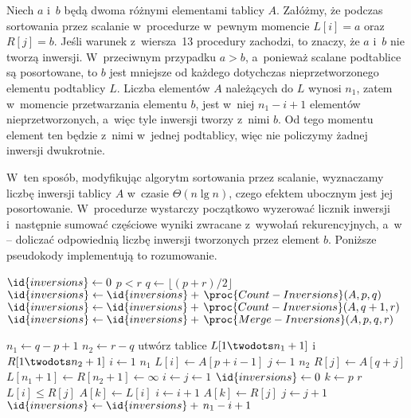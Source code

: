 \subproblem %
Niech $a$ i~$b$ będą dwoma różnymi elementami tablicy $A$. Załóżmy, że podczas sortowania przez scalanie w~procedurze  w~pewnym momencie $L[i]=a$ oraz $R[j]=b$. Jeśli warunek z~wiersza~13 procedury  zachodzi, to znaczy, że $a$ i~$b$ nie tworzą inwersji. W~przeciwnym przypadku $a>b$, a~ponieważ scalane podtablice są posortowane, to $b$ jest mniejsze od każdego dotychczas nieprzetworzonego elementu podtablicy $L$. Liczba elementów $A$ należących do $L$ wynosi $n_1$, zatem w~momencie przetwarzania elementu $b$, jest w~niej $n_1-i+1$ elementów nieprzetworzonych, a~więc tyle inwersji tworzy z~nimi $b$. Od tego momentu element ten będzie z~nimi w~jednej podtablicy, więc nie policzymy żadnej inwersji dwukrotnie.

W~ten sposób, modyfikując algorytm sortowania przez scalanie, wyznaczamy liczbę inwersji  tablicy $A$ w~czasie $\Theta(n\lg n)$, czego efektem ubocznym jest jej posortowanie. W~procedurze  wystarczy początkowo wyzerować licznik inwersji i~następnie sumować częściowe wyniki zwracane z~wywołań rekurencyjnych, a~w~ -- doliczać odpowiednią liczbę inwersji tworzonych przez element $b$. Poniższe pseudokody implementują to rozumowanie.

\begin{codebox}
\li	$\id{inversions}\gets0$
\li	\If $p<r$
\li		\Then
			$q\gets\lfloor(p+r)/2\rfloor$
\li			$\id{inversions}\gets\id{inversions}+\,\proc{Count-Inversions}(A,p,q)$
\li			$\id{inversions}\gets\id{inversions}+\,\proc{Count-Inversions}(A,q+1,r)$
\li			$\id{inversions}\gets\id{inversions}+\,\proc{Merge-Inversions}(A,p,q,r)$
		\End
\li	\Return {}
\end{codebox}

\begin{codebox}
\li	$n_1\gets q-p+1$
\li	$n_2\gets r-q$
\li	utwórz tablice $L[1\twodots n_1+1]$ i~$R[1\twodots n_2+1]$
\li	\For $i\gets1$ \To $n_1$
\li		\Do $L[i]\gets A[p+i-1]$
		\End
\li	\For $j\gets1$ \To $n_2$
\li		\Do $R[j]\gets A[q+j]$
		\End
\li	$L[n_1+1]\gets R[n_2+1]\gets\infty$
\li	$i\gets j\gets1$
\li	$\id{inversions}\gets0$
\li	\For $k\gets p$ \To $r$
\li		\Do
			\If $L[i]\le R[j]$
\li				\Then
					$A[k]\gets L[i]$
\li					$i\gets i+1$
\li				\Else
					$A[k]\gets R[j]$
\li					$j\gets j+1$
\li					$\id{inversions}\gets\id{inversions}+\,n_1-i+1$
				\End
		\End
\li	\Return {}
\end{codebox}

\endinput
